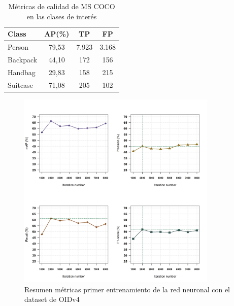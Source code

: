 \begin{table}[ht]
\centering
\caption{Métricas de calidad de MS COCO en las clases de interés}
\label{tab:metricas-clases-coco}
\begin{tabular}{lccc}
\hline
\textbf{Class} & \textbf{AP(\%)} & \textbf{TP} & \textbf{FP} \\ \hline
Person         & 79,53           & 7.923       & 3.168       \\
Backpack       & 44,10           & 172         & 156         \\
Handbag        & 29,83           & 158         & 215         \\
Suitcase       & 71,08           & 205         & 102         \\ \hline
\end{tabular}
\end{table}

\newpage

\begin{figure}[ht]
\centering
\includegraphics[width=0.85\textwidth]{img/chapters/resultados/metricas/metrics-train1.png}
\caption{\label{fig:metrics-train1}Resumen métricas primer entrenamiento de la red neuronal con el dataset de OIDv4}
\end{figure}

\newpage

